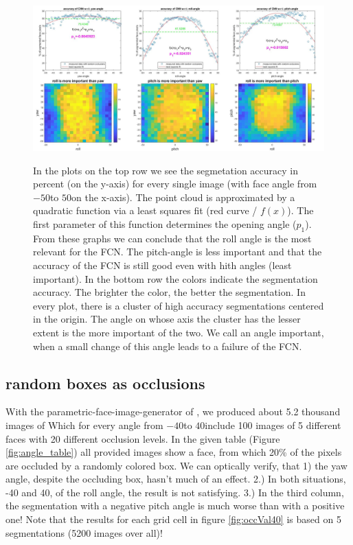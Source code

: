 \begin{figure}[h]
	\centering
	\includegraphics[width=\textwidth]{Figures/evaluation_angles.png}
	\label{fig:evaluation_angles}
	\caption{In the plots on the top row we see the segmetation accuracy in percent (on the y-axis) for every single image (with face angle from $-50$\textdegree to $50$\textdegree on the x-axis). The point cloud is approximated by a quadratic function via a least squares fit (red curve / $f(x)$). The first parameter of this function determines the opening angle ($p_1$). From these graphs we can conclude that the roll angle is the most relevant for the FCN. The pitch-angle is less important and that the accuracy of the FCN is still good even with hith angles (least important). In the bottom row the colors indicate the segmentation accuracy. The brighter the color, the better the segmentation. In every plot, there is a cluster of high accuracy segmentations centered in the origin. The angle on whose axis the cluster has the lesser extent is the more important of the two. We call an angle important, when a small change of this angle leads to a failure of the FCN. }
\end{figure}

\subsection{random boxes as occlusions}
With the parametric-face-image-generator of \cite{parametric}, we produced about 5.2 thousand images of Which for every angle from $-40$\textdegree to $40$\textdegree  include 100 images of 5 different faces with 20 different occlusion levels. In the given table (Figure \ref{fig:angle_table}) all provided images show a face, from which 20\% of the pixels are occluded by a randomly colored box. We can optically verify, that 1) the yaw angle, despite the occluding box, hasn't much of an effect. 2.) In both situations, -40 and 40, of the roll angle, the result is not satisfying. 3.) In the third column, the segmentation with a negative pitch angle is much worse than with a positive one! Note that the results for each grid cell in figure \ref{fig:occVal40} is based on 5 segmentations (5200 images over all)!\\

